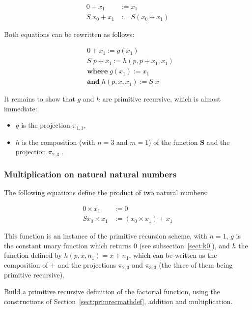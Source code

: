 \begin{align*}
  0 + x_1 &:= x_1 \\
  S\; x_0 + x_1 &:= S (x_0 + x_1)
\end{align*}

Both equations can be rewritten as follows:

\begin{align*}
&0 + x_1 := g(x_1) \\
& S \; p +x_1 := h(p, p+x_1, x_1) \\
&\textbf{where}\; g(x_1):= x_1 \\
&\textbf{and}\; h(p,x, x_1) := S\;x 
\end{align*}

It remains to show that $g$ and $h$ are primitive recursive, which is almost immediate:


\begin{itemize}
\item $g$ is the projection $\pi_{1,1}$,
\item $h$ is the composition (with $n=3$ and $m=1$) of the function \textbf{S} and the projection $\pi_{2,3}$ .
\end{itemize}


\subsubsection{Multiplication on natural natural numbers}

The following equations define the product of two natural numbers:

\begin{align*}
  0 \times x_1 &:= 0 \\
  S x_0 \times x_1 &:= (x_0 \times x_1) + x_1
\end{align*}  

This function is an instance of the primitive recursion scheme,
with $n=1$, $g$ is the constant unary function which returns $0$ (see subsection~\vref{sect:k0}),
 and $h$ the function defined by $h(p,x,n_1)=x+n_1$, which can be written as the composition of $+$ and the projections 
$\pi_{2,3}$ and $\pi_{3,3}$ (the three of them  being  primitive recursive).

\begin{exercise}
 Build a primitive recursive definition of the factorial function,
using the constructions of  Section~\ref{sect:primrecmathdef},
addition and multiplication.
\end{exercise}





